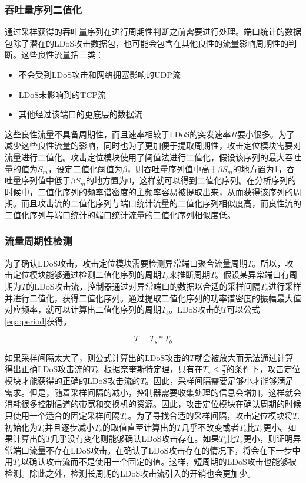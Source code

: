 \subsubsection{吞吐量序列二值化}
\label{chap4:binarization}
通过采样获得的吞吐量序列在进行周期性判断之前需要进行处理。端口统计的数据包除了潜在的LDoS攻击数据包，也可能会包含在其他良性的流量影响周期性的判断。这些良性流量括三类：
\begin{itemize}
	\item 不会受到LDoS攻击和网络拥塞影响的UDP流
	\item LDoS未影响到的TCP流
	\item 其他经过该端口的更底层的数据流
\end{itemize}
这些良性流量不具备周期性，而且速率相较于LDoS的突发速率$R$要小很多。为了减少这些良性流量的影响，同时也为了更加便于提取周期性，攻击定位模块需要对流量进行二值化。攻击定位模块使用了阈值法进行二值化，假设该序列的最大吞吐量的值为$S_m$，设定二值化阈值为$\beta$，则吞吐量序列值中高于$\beta S_m$的地方置为1，吞吐量序列值中低于$\beta S_m$的地方置为0，这样就可以得到二值化序列。在分析序列的时候中，二值化序列的频率谱密度的主频率容易被提取出来，从而获得该序列的周期。而且攻击流的二值化序列与端口统计流量的二值化序列相似度高，而良性流的二值化序列与端口统计的端口统计流量的二值化序列相似度低。

\subsubsection{流量周期性检测}
为了确认LDoS攻击，攻击定位模块需要检测异常端口聚合流量周期$T$。所以，攻击定位模块能够通过检测二值化序列的周期$T_b$来推断周期$T$。假设某异常端口有周期为$T$的LDoS攻击流，控制器通过对异常端口的数据以合适的采样间隔$T_s$进行采样并进行二值化，获得二值化序列。通过提取二值化序列的功率谱密度的振幅最大值对应频率，就可以计算出二值化序列的周期$T_b$。LDoS攻击的$T$可以公式\ref{eqa:period}获得。

\begin{equation}
	\label{eqa:period}
	T = T_s * T_b
\end{equation}

如果采样间隔太大了，则公式计算出的LDoS攻击的$T$就会被放大而无法通过计算得出正确LDoS攻击流的$T$。根据奈奎斯特定理，只有在$T_s \le \frac{T}{2}$的条件下，攻击定位模块才能获得的正确的LDoS攻击流的$T$。因此，采样间隔需要足够小才能够满足需求。但是，随着采样间隔的减小，控制器需要收集处理的信息会增加，这样就会消耗很多控制信道的带宽和交换机的资源。因此，攻击定位模块在确认周期的时候只使用一个适合的固定采样间隔$T_s$。为了寻找合适的采样间隔，攻击定位模块将$T_s$初始化为$T_i$并且逐步减小$T_s$的取值直至计算出的$T$几乎不改变或者$T_s$比$T_e$更小。如果计算出的$T$几乎没有变化则能够确认LDoS攻击存在。如果$T_s$比$T_e$更小，则证明异常端口流量不存在LDoS攻击。在确认了LDoS攻击存在的情况下，将会在下一步中用$T_s$以确认攻击流而不是使用一个固定的值。这样，短周期的LDoS攻击也能够被检测。除此之外，检测长周期的LDoS攻击流引入的开销也会更加少。

